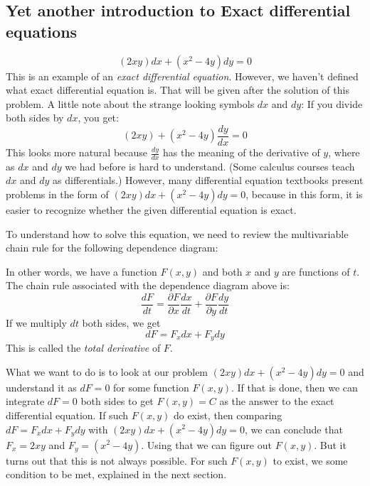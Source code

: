 \documentclass[12pt]{report}
\begin{document}
\subsection*{Yet another introduction to Exact differential equations}
$$ (2xy) dx + (x^2 - 4y) dy =0$$
This is an example of an \textit{exact differential equation}. However, we haven't defined what exact differential equation is. That will be given after the solution of this problem.
A little note about the strange looking symbols $dx$ and $dy$:  If you divide both sides by $dx$, you get:
$$ (2xy) + (x^2 - 4y) \frac{dy}{dx} =0$$
This looks more natural because $\frac{dy}{dx}$ has the meaning of the derivative of $y$, where as $dx$ and $dy$ we had before is hard to understand. (Some calculus courses teach $dx$ and $dy$ as differentials.)
However, many differential equation textbooks present problems in the form of $ (2xy) dx + (x^2 - 4y) dy =0$, because in this form, it is easier to recognize whether the given differential equation is exact.

To understand how to solve this equation, we need to review the multivariable chain rule for the following dependence diagram:

\begin{center}
\end{center}

In other words, we have a function $F(x,y)$ and both $x$ and $y$ are functions of $t$.
The chain rule associated with the dependence diagram above is:
$$\frac{dF}{dt}=\frac{\partial F}{\partial x}\frac{dx}{dt} + \frac{\partial F}{\partial y} \frac{dy}{dt} $$
If we multiply $dt$ both sides, we get
$$ dF = F_x dx + F_y dy$$
This is called the \textit{total derivative} of $F$.

What we want to do is to look at our problem $ (2xy) dx + (x^2 - 4y) dy =0$ and understand it as $dF =0$ for some function $F(x,y)$. If that is done, then we can integrate $dF =0$ both sides to get $F(x,y) =C$ as the answer to the exact differential equation. If such $F(x,y)$ do exist, then comparing $dF = F_x dx + F_y dy$ with $ (2xy) dx + (x^2 - 4y) dy =0$, we can conclude that $F_x = 2xy$ and $F_y = (x^2-4y)$. Using that we can figure out $F(x,y)$. But it turns out that this is not always possible. For such $F(x,y)$ to exist, we some condition to be met, explained in the next section.
\end{document}
